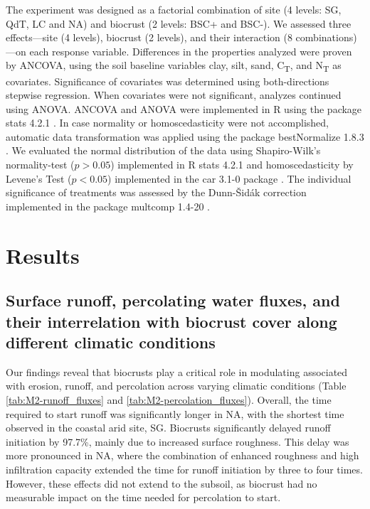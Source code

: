 The experiment was designed as a factorial combination of site (4 levels: SG, QdT, LC and NA) and biocrust (2 levels: BSC+ and BSC-). We assessed three effects—site (4 levels), biocrust (2 levels), and their interaction (8 combinations)—on each response variable. Differences in the properties analyzed were proven by ANCOVA, using the soil baseline variables clay, silt, sand, C\textsubscript{T}, and N\textsubscript{T} as covariates. Significance of covariates was determined using both-directions stepwise regression. When covariates were not significant, analyzes continued using ANOVA. ANCOVA and ANOVA were implemented in R using the package stats 4.2.1 \citep{RCoreTeam2022}. In case normality or homoscedasticity were not accomplished, automatic data transformation was applied using the package bestNormalize 1.8.3 \citep{Peterson2021,Peterson2020}. We evaluated the normal distribution of the data using Shapiro-Wilk's normality-test ($p> 0.05$) implemented in R stats 4.2.1 \citep{RCoreTeam2022} and homoscedasticity by Levene's Test ($p<0.05$) implemented in the car 3.1-0 package \citep{Fox2018}. The individual significance of treatments was assessed by the Dunn-Šidák correction implemented in the package multcomp 1.4-20 \citep{Hothorn2008}.

\section{Results}
\subsection{Surface runoff, percolating water fluxes, and their interrelation with biocrust cover along different climatic conditions}

Our findings reveal that biocrusts play a critical role in modulating associated with erosion, runoff, and percolation across varying climatic conditions (Table \ref{tab:M2-runoff_fluxes} and \ref{tab:M2-percolation_fluxes}). Overall, the time required to start runoff was significantly longer in NA, with the shortest time observed in the coastal arid site, SG. Biocrusts significantly delayed runoff initiation by 97.7\%, mainly due to increased surface roughness. This delay was more pronounced in NA, where the combination of enhanced roughness and high infiltration capacity extended the time for runoff initiation by three to four times. However, these effects did not extend to the subsoil, as biocrust had no measurable impact on the time needed for percolation to start.

